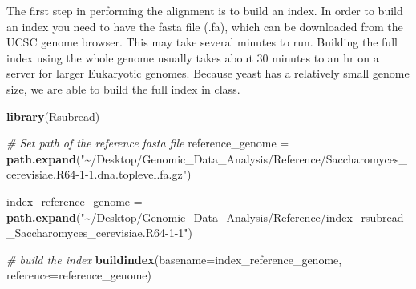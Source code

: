 \documentclass[
]{book}
\newenvironment{Shaded}{\begin{snugshade}}{\end{snugshade}}
\newcommand{\AttributeTok}[1]{\textcolor[rgb]{0.13,0.29,0.53}{#1}}
\newcommand{\CommentTok}[1]{\textcolor[rgb]{0.56,0.35,0.01}{\textit{#1}}}
\newcommand{\FunctionTok}[1]{\textcolor[rgb]{0.13,0.29,0.53}{\textbf{#1}}}
\newcommand{\NormalTok}[1]{#1}
\newcommand{\OtherTok}[1]{\textcolor[rgb]{0.56,0.35,0.01}{#1}}
\newcommand{\StringTok}[1]{\textcolor[rgb]{0.31,0.60,0.02}{#1}}
\begin{document}
The first step in performing the alignment is to build an index. In order to build an index you need to have the fasta file (.fa), which can be downloaded from the UCSC genome browser. This may take several minutes to run. Building the full index using the whole genome usually takes about 30 minutes to an hr on a server for larger Eukaryotic genomes. Because yeast has a relatively small genome size, we are able to build the full index in class.

\begin{Shaded}
\begin{Highlighting}[]
\FunctionTok{library}\NormalTok{(Rsubread)}

\CommentTok{\# Set path of the reference fasta file}
\NormalTok{reference\_genome }\OtherTok{=} \FunctionTok{path.expand}\NormalTok{(}\StringTok{"\textasciitilde{}/Desktop/Genomic\_Data\_Analysis/Reference/Saccharomyces\_cerevisiae.R64{-}1{-}1.dna.toplevel.fa.gz"}\NormalTok{)}

\NormalTok{index\_reference\_genome }\OtherTok{=} \FunctionTok{path.expand}\NormalTok{(}\StringTok{"\textasciitilde{}/Desktop/Genomic\_Data\_Analysis/Reference/index\_rsubread\_Saccharomyces\_cerevisiae.R64{-}1{-}1"}\NormalTok{)}

\CommentTok{\# build the index}
\FunctionTok{buildindex}\NormalTok{(}\AttributeTok{basename=}\NormalTok{index\_reference\_genome, }\AttributeTok{reference=}\NormalTok{reference\_genome)}
\end{Highlighting}
\end{Shaded}
\end{document}
